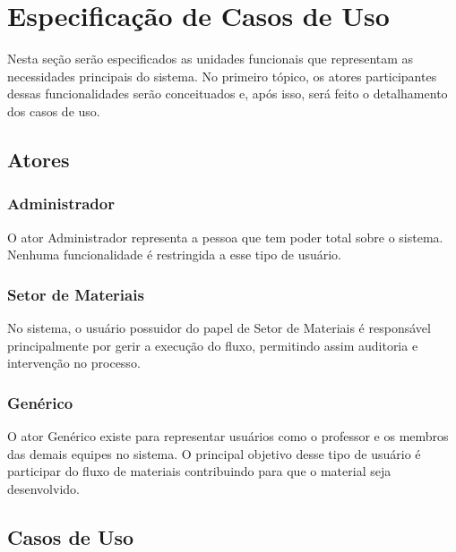 \section{Especificação de Casos de Uso}

Nesta seção serão especificados as unidades funcionais que representam as necessidades principais do sistema. No primeiro tópico, os atores participantes dessas funcionalidades serão conceituados e, após isso, será feito o detalhamento dos casos de uso.

\subsection{Atores}

\subsubsection{Administrador}

O ator Administrador representa a pessoa que tem poder total sobre o sistema. Nenhuma funcionalidade é restringida a esse tipo de usuário.

\subsubsection{Setor de Materiais}

No sistema, o usuário possuidor do papel de Setor de Materiais é responsável principalmente por gerir a execução do fluxo, permitindo assim auditoria e intervenção no processo.

\subsubsection{Genérico}

O ator Genérico existe para representar usuários como o professor e os membros das demais equipes no sistema. O principal objetivo desse tipo de usuário é participar do fluxo de materiais contribuindo para que o material seja desenvolvido.

\subsection{Casos de Uso}
     
